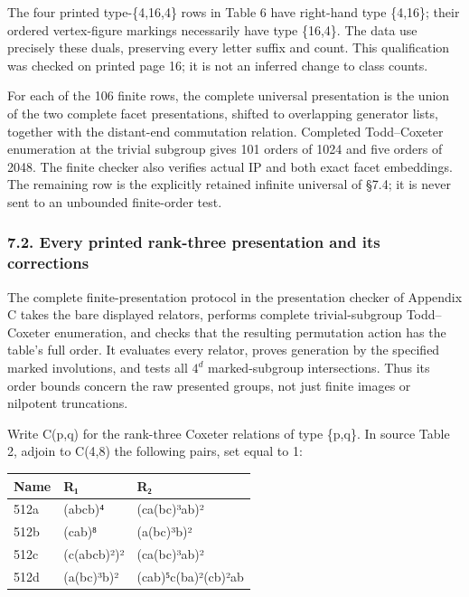\documentclass[
  11pt,
  a4paper,
]{article}
\newcounter{none} %
\begin{document}
The four printed type-\{4,16,4\} rows in Table 6 have right-hand type
\{4,16\}; their ordered vertex-figure markings necessarily have type
\{16,4\}. The data use precisely these duals, preserving every letter
suffix and count. This qualification was checked on printed page 16; it
is not an inferred change to class counts.

For each of the 106 finite rows, the complete universal presentation is
the union of the two complete facet presentations, shifted to
overlapping generator lists, together with the distant-end commutation
relation. Completed Todd--Coxeter enumeration at the trivial subgroup
gives 101 orders of 1024 and five orders of 2048. The finite checker
also verifies actual IP and both exact facet embeddings. The remaining
row is the explicitly retained infinite universal of §7.4; it is never
sent to an unbounded finite-order test.

\subsubsection{7.2. Every printed rank-three presentation and its
corrections}\label{every-printed-rank-three-presentation-and-its-corrections}

The complete finite-presentation protocol in the presentation checker of
Appendix C takes the bare displayed relators, performs complete
trivial-subgroup Todd--Coxeter enumeration, and checks that the
resulting permutation action has the table's full order. It evaluates
every relator, proves generation by the specified marked involutions,
and tests all \(4^{d}\) marked-subgroup intersections. Thus its order
bounds concern the raw presented groups, not just finite images or
nilpotent truncations.

Write C(p,q) for the rank-three Coxeter relations of type \{p,q\}. In
source Table 2, adjoin to C(4,8) the following pairs, set equal to 1:

{\def\LTcaptype{none} %
\begin{longtable}[]{@{}lll@{}}
\toprule\noalign{}
Name & R₁ & R₂ \\
\midrule\noalign{}
\endhead
\bottomrule\noalign{}
\endlastfoot
512a & (abcb)⁴ & (ca(bc)³ab)² \\
512b & (cab)⁸ & (a(bc)³b)² \\
512c & (c(abcb)²)² & (ca(bc)³ab)² \\
512d & (a(bc)³b)² & (cab)⁵c(ba)²(cb)²ab \\
\end{longtable}
}
\end{document}
